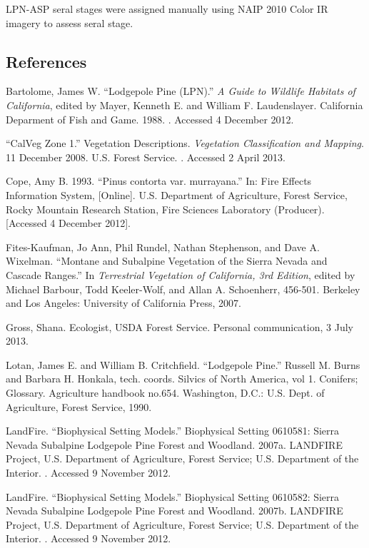 LPN-ASP seral stages were assigned manually using NAIP 2010 Color IR imagery to assess seral stage.



\clearpage
\subsection*{References}
\begin{hangparas}{.25in}{1} 
Bartolome, James W. ``Lodgepole Pine (LPN).'' \emph{A Guide to Wildlife Habitats of California}, edited by Mayer, Kenneth E. and William F. Laudenslayer. California Deparment of Fish and Game. 1988. . Accessed 4 December 2012.

``CalVeg Zone 1.'' Vegetation Descriptions. \emph{Vegetation Classification and Mapping}.  11 December 2008. U.S. Forest Service. . Accessed 2 April 2013.

Cope, Amy B. 1993. ``Pinus contorta var. murrayana.'' In: Fire Effects Information System, [Online].  U.S. Department of Agriculture, Forest Service,  Rocky Mountain Research Station, Fire Sciences Laboratory (Producer).   [Accessed 4 December 2012].

Fites-Kaufman, Jo Ann, Phil Rundel, Nathan Stephenson, and Dave A. Wixelman. ``Montane and Subalpine Vegetation of the Sierra Nevada and Cascade Ranges.'' In \emph{Terrestrial Vegetation of California, 3rd Edition}, edited by Michael Barbour, Todd Keeler-Wolf, and Allan A. Schoenherr, 456-501. Berkeley and Los Angeles: University of California Press, 2007. 

Gross, Shana. Ecologist, USDA Forest Service. Personal communication, 3 July 2013.

Lotan, James E. and William B. Critchfield. ``Lodgepole Pine.'' Russell M. Burns and Barbara H. Honkala, tech. coords. Silvics of North America, vol 1. Conifers; Glossary. Agriculture handbook no.654. Washington, D.C.: U.S. Dept. of Agriculture, Forest Service, 1990. 

LandFire. ``Biophysical Setting Models.'' Biophysical Setting 0610581: Sierra Nevada Subalpine Lodgepole Pine Forest and Woodland. 2007a. LANDFIRE Project, U.S. Department of Agriculture, Forest Service; U.S. Department of the Interior. . Accessed 9 November 2012.

LandFire. ``Biophysical Setting Models.'' Biophysical Setting 0610582: Sierra Nevada Subalpine Lodgepole Pine Forest and Woodland. 2007b. LANDFIRE Project, U.S. Department of Agriculture, Forest Service; U.S. Department of the Interior. . Accessed 9 November 2012.


\end{hangparas}
